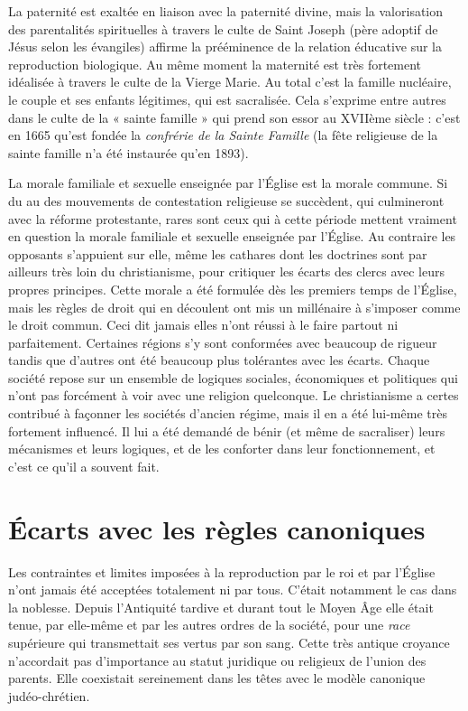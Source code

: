  La paternité est exaltée en liaison avec la paternité divine, mais la valorisation des parentalités spirituelles à travers le culte de Saint Joseph (père adoptif de Jésus selon les évangiles) affirme la prééminence de la relation éducative sur la reproduction biologique. Au même moment la maternité est très fortement idéalisée à travers le culte de la Vierge Marie. Au total c'est la famille nucléaire, le couple et ses enfants légitimes, qui est sacralisée. Cela s'exprime entre autres dans le culte de la « sainte famille » qui prend son essor au XVIIème siècle : c'est en 1665 qu'est fondée la \emph{confrérie de la Sainte Famille} (la fête religieuse de la sainte famille n'a été instaurée qu'en 1893). 
 
 La morale familiale et sexuelle enseignée par l'Église est la morale commune. Si du  au  des mouvements de contestation religieuse se succèdent, qui culmineront avec la réforme protestante, rares sont ceux qui à cette période mettent vraiment en question la morale familiale et sexuelle enseignée par l'Église. Au contraire les opposants s'appuient sur elle, même les cathares dont les doctrines sont par ailleurs très loin du christianisme, pour critiquer les écarts des clercs avec leurs propres principes. Cette morale a été formulée dès les premiers temps de l'Église, mais les règles de droit qui en découlent ont mis un millénaire à s'imposer comme le droit commun. Ceci dit jamais elles n'ont réussi à le faire partout ni parfaitement. Certaines régions s'y sont conformées avec beaucoup de rigueur tandis que d'autres ont été beaucoup plus tolérantes avec les écarts. Chaque société repose sur un ensemble de logiques sociales, économiques et politiques qui n'ont pas forcément à voir avec une religion quelconque. Le christianisme a certes contribué à façonner les sociétés d'ancien régime, mais il en a été lui-même très fortement influencé. Il lui a été demandé de bénir (et même de sacraliser) leurs mécanismes et leurs logiques, et de les conforter dans leur fonctionnement, et c'est ce qu'il a souvent fait. 
 
 \section{Écarts avec les règles canoniques}

 Les contraintes et limites imposées à la reproduction par le roi et par l'Église n'ont jamais été acceptées totalement ni par tous. C'était notamment le cas dans la noblesse. Depuis l'Antiquité tardive et durant tout le Moyen Âge elle était tenue, par elle-même et par les autres ordres de la société, pour une \emph{race} supérieure qui transmettait ses vertus par son sang. Cette très antique croyance n'accordait pas d'importance au statut juridique ou religieux de l'union des parents. Elle coexistait sereinement dans les têtes avec le modèle canonique judéo-chrétien. 


